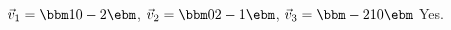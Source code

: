{$\vec{v}_1 = \bbm 1\\0\\-2\ebm$, $\vec{v}_2 = \bbm 0\\2\\-1\ebm$, $\vec{v}_3 = \bbm -2\\1\\0\ebm$}
{Yes.}